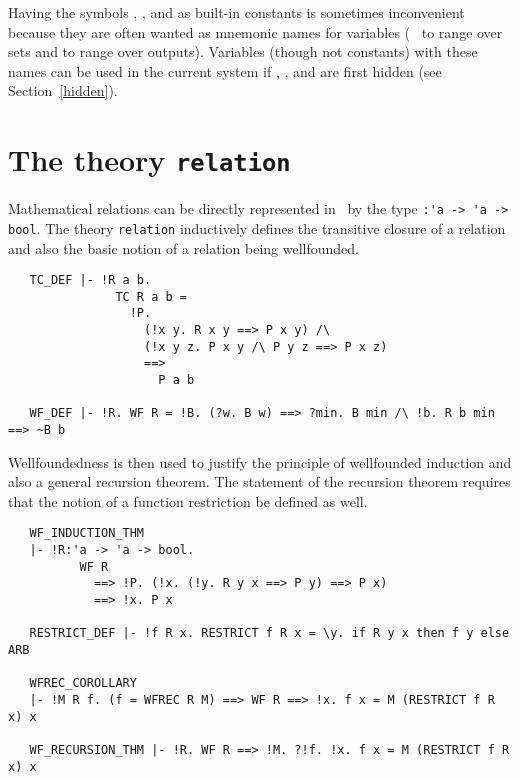 Having the symbols , ,  and  as built-in
constants is sometimes inconvenient because they are often wanted as mnemonic
names for variables (\eg\  to range over sets and  to range over
outputs).  Variables
(though not constants) with these names can be used in the current system if
, ,  and  are first hidden (see Section~\ref{hidden}).
 

\section{The theory {\tt relation}}\label{relation}

Mathematical relations can be directly represented in \HOL\ by the type
{\small\verb+:'a -> 'a -> bool+}. The theory {\small\verb+relation+}
inductively defines the transitive closure of a relation and also the
basic notion of a relation being wellfounded. 

\begin{hol} \begin{verbatim}
   TC_DEF |- !R a b.
               TC R a b =
                 !P.
                   (!x y. R x y ==> P x y) /\ 
                   (!x y z. P x y /\ P y z ==> P x z) 
                   ==>
                     P a b
   
   WF_DEF |- !R. WF R = !B. (?w. B w) ==> ?min. B min /\ !b. R b min ==> ~B b
\end{verbatim}\end{hol}

Wellfoundedness is then used to justify the principle of wellfounded
induction and also a general recursion theorem. The statement of the 
recursion theorem requires that the notion of a function restriction be
defined as well. 

\begin{hol} \begin{verbatim}
   WF_INDUCTION_THM
   |- !R:'a -> 'a -> bool. 
          WF R 
            ==> !P. (!x. (!y. R y x ==> P y) ==> P x) 
            ==> !x. P x
   
   RESTRICT_DEF |- !f R x. RESTRICT f R x = \y. if R y x then f y else ARB

   WFREC_COROLLARY
   |- !M R f. (f = WFREC R M) ==> WF R ==> !x. f x = M (RESTRICT f R x) x
   
   WF_RECURSION_THM |- !R. WF R ==> !M. ?!f. !x. f x = M (RESTRICT f R x) x

\end{verbatim}\end{hol}


